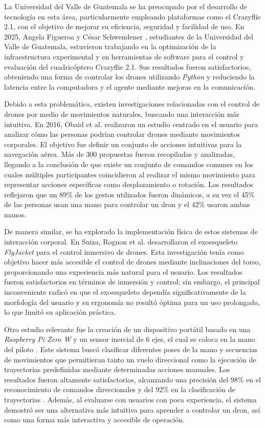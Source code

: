 La Universidad del Valle de Guatemala se ha preocupado por el desarrollo de tecnología en esta área, particularmente empleando plataformas como el Crazyflie 2.1, con el objetivo de mejorar su eficiencia, seguridad y facilidad de uso. En 2025, Angela Figueroa \cite{figueroa2025desarrollo} y César Schwendener \cite{schwendener2025desarrollo}, estudiantes de la Universidad del Valle de Guatemala, estuvieron trabajando en la optimización de la infraestructura experimental y en herramientas de software para el control y evaluación del cuadricóptero Crazyflie 2.1. Sus resultados fueron satisfactorios, obteniendo una forma de controlar los drones utilizando \textit{Python} y reduciendo la latencia entre la computadora y el agente mediante mejoras en la comunicación. 

 

Debido a esta problemática, existen investigaciones relacionadas con el control de drones por medio de movimientos naturales, buscando una interacción más intuitiva. En 2016, Obaid et al. \cite{obaid2016would} realizaron un estudio centrado en el usuario para analizar cómo las personas podrían controlar drones mediante movimientos corporales. El objetivo fue definir un conjunto de acciones intuitivas para la navegación aérea. Más de 300 propuestas fueron recopiladas y analizadas, llegando a la conclusión de que existe un conjunto de comandos comunes en los cuales múltiples participantes coincidieron al realizar el mismo movimiento para representar acciones específicas como desplazamiento o rotación. Los resultados reflejaron que un  89\% de los gestos utilizados fueron dinámicos, a su vez el 45\% de las personas usan una mano para controlar un dron y el  42\% usaron ambas manos.

De manera similar,  se ha explorado la implementación física de estos sistemas de interacción corporal. En Suiza, Rognon et al. \cite{8304759} desarrollaron el exoesqueleto \textit{FlyJacket} para el control inmersivo de drones. Esta investigación tenía como objetivo hacer más accesible el control de drones mediante inclinaciones del torso, proporcionando una experiencia más natural para el usuario. Los resultados fueron satisfactorios en términos de inmersión y control; sin embargo, el principal inconveniente radicó en que el exoesqueleto dependía significativamente de la morfología del usuario y su ergonomía no resultó óptima para un uso prolongado, lo que limitó su aplicación práctica.

Otro estudio relevante fue la creación de un dispositivo portátil basado en una \textit{Raspberry Pi Zero W} y un sensor inercial de 6 ejes, el cual se coloca en la mano del piloto \cite{8662106}. Este sistema buscó clasificar diferentes poses de la mano y secuencias de movimientos que permitieran tanto un vuelo direccional como la ejecución de trayectorias predefinidas mediante determinadas acciones manuales. Los resultados fueron altamente satisfactorios, alcanzando una precisión del 98\% en el reconocimiento de comandos direccionales y del 92\% en la clasificación de trayectorias \cite{8662106}. Además, al evaluarse con usuarios con poca experiencia, el sistema demostró ser una alternativa más intuitiva para aprender a controlar un dron, así como una forma más interactiva y accesible de operación.

